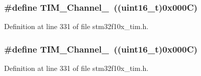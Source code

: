 \subsubsection[{\texorpdfstring{T\+I\+M\+\_\+\+Channel\+\_\+4}{TIM_Channel_4}}]{\setlength{\rightskip}{0pt plus 5cm}\#define T\+I\+M\+\_\+\+Channel\+\_~(({\bf uint16\+\_\+t})0x000\+C)}\hypertarget{group___t_i_m___channel_ga7414888c40d066af235bc1f80b99bd9d}{}\label{group___t_i_m___channel_ga7414888c40d066af235bc1f80b99bd9d}


Definition at line 331 of file stm32f10x\+\_\+tim.\+h.

\subsubsection[{\texorpdfstring{T\+I\+M\+\_\+\+Channel\+\_\+4}{TIM_Channel_4}}]{\setlength{\rightskip}{0pt plus 5cm}\#define T\+I\+M\+\_\+\+Channel\+\_~(({\bf uint16\+\_\+t})0x000\+C)}\hypertarget{group___t_i_m___channel_ga7414888c40d066af235bc1f80b99bd9d}{}\label{group___t_i_m___channel_ga7414888c40d066af235bc1f80b99bd9d}


Definition at line 331 of file stm32f10x\+\_\+tim.\+h.

